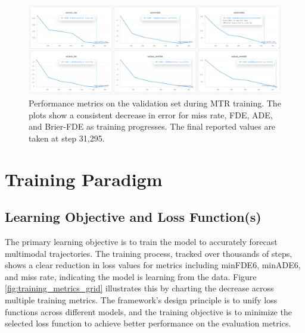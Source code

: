 \begin{figure}[h!]
    \centering
    \includegraphics[width=\textwidth]{figures/performance_metrics_validation.png}
    \caption{Performance metrics on the validation set during MTR training. The plots show a consistent decrease in error for miss rate, FDE, ADE, and Brier-FDE as training progresses. The final reported values are taken at step 31,295.}
    \label{fig:validation_metrics}
\end{figure}

\section{Training Paradigm}
\label{sec:model_training_paradigm}
\subsection{Learning Objective and Loss Function(s)}
\label{sec:model_loss_functions}
The primary learning objective is to train the model to accurately forecast multimodal trajectories. The training process, tracked over thousands of steps, shows a clear reduction in loss values for metrics including minFDE6, minADE6, and miss rate, indicating the model is learning from the data. Figure \ref{fig:training_metrics_grid} illustrates this by charting the decrease across multiple training metrics. The framework's design principle is to unify loss functions across different models, and the training objective is to minimize the selected loss function to achieve better performance on the evaluation metrics.

